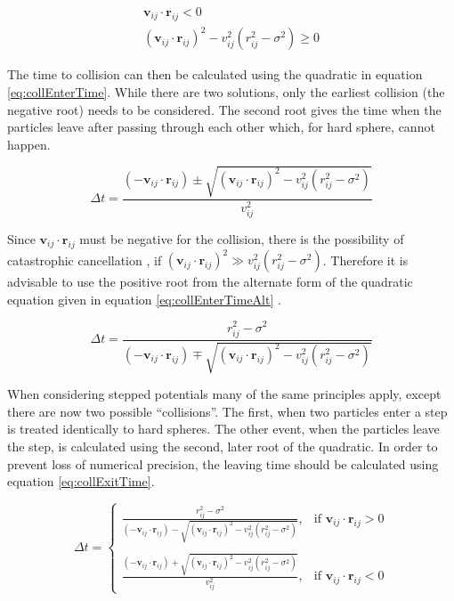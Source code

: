 \documentclass[12pt]{UoAthesis}
\begin{document}
\begin{subequations}
  \begin{align}
    \mathbf{v}_{ij}\cdot\mathbf{r}_{ij} < 0 \label{eq:collConditions1}\\
    (\mathbf{v}_{ij}\cdot\mathbf{r}_{ij})^2 
    - v_{ij}^2(r_{ij}^2 - \sigma^2) \geq 0 \label{eq:collConditions2}
  \end{align}
\end{subequations}

The time to collision can then be calculated using the quadratic in
equation \eqref{eq:collEnterTime}.  While there are two solutions,
only the earliest collision (the negative root) needs to be
considered.  The second root gives the time when the particles leave
after passing through each other which, for hard sphere, cannot
happen.

\begin{equation}
\Delta t = \frac{(-\mathbf{v}_{ij}\cdot\mathbf{r}_{ij}) \pm 
  \sqrt{(\mathbf{v}_{ij}\cdot\mathbf{r}_{ij})^2 - v_{ij}^2(r_{ij}^2 - \sigma^2)}}
       {v_{ij}^2} \label{eq:collEnterTime}
\end{equation}

Since $\mathbf{v}_{ij}\cdot\mathbf{r}_{ij}$ must be negative for the
collision, there is the possibility of catastrophic cancellation
\cite{Goldberg1991}, if $(\mathbf{v}_{ij}\cdot\mathbf{r}_{ij})^2 \gg
v_{ij}^2(r_{ij}^2 - \sigma^2)$. Therefore it is advisable to use the
positive root from the alternate form of the quadratic equation given
in equation \eqref{eq:collEnterTimeAlt} \cite{Poschel2005}.

\begin{equation}
\Delta t = \frac{r_{ij}^2 - \sigma^2}{(-\mathbf{v}_{ij}\cdot\mathbf{r}_{ij})
  \mp \sqrt{(\mathbf{v}_{ij}\cdot\mathbf{r}_{ij})^2 
    - v_{ij}^2(r_{ij}^2 - \sigma^2)}}
\label{eq:collEnterTimeAlt}
\end{equation}

When considering stepped potentials many of the same principles apply,
except there are now two possible ``collisions''. The first, when two
particles enter a step is treated identically to hard spheres. The
other event, when the particles leave the step, is calculated using
the second, later root of the quadratic.  In order to prevent loss of
numerical precision, the leaving time should be calculated using
equation \eqref{eq:collExitTime}.

\begin{equation}
  \label{eq:collExitTime}
\Delta t = 
\begin{cases}
  \frac{r_{ij}^2 - \sigma^2}{(-\mathbf{v}_{ij}\cdot\mathbf{r}_{ij})
    - \sqrt{(\mathbf{v}_{ij}\cdot\mathbf{r}_{ij})^2 
      - v_{ij}^2(r_{ij}^2 - \sigma^2)}}, & \text{if }
  \mathbf{v}_{ij}\cdot\mathbf{r}_{ij} > 0 \\
\\

\frac{(-\mathbf{v}_{ij}\cdot\mathbf{r}_{ij}) +
  \sqrt{(\mathbf{v}_{ij}\cdot\mathbf{r}_{ij})^2 - v_{ij}^2(r_{ij}^2 - \sigma^2)}}
     {v_{ij}^2} , & \text{if }
     \mathbf{v}_{ij}\cdot\mathbf{r}_{ij} < 0 
\end{cases}
\end{equation}
\end{document}
